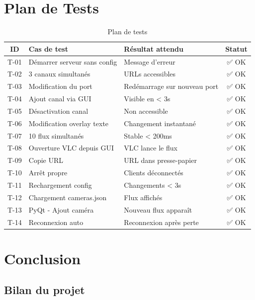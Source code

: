 \documentclass[12pt,a4paper]{report}
\begin{document}
\chapter{Plan de Tests}

\begin{table}[H]
    \centering
    \caption{Plan de tests}
    \label{tab:tests}
    \begin{tabular}{|c|l|l|c|}
        \hline
        \textbf{ID} & \textbf{Cas de test} & \textbf{Résultat attendu} & \textbf{Statut} \\
        \hline
        T-01 & Démarrer serveur sans config & Message d'erreur & ✅ OK \\
        T-02 & 3 canaux simultanés & URLs accessibles & ✅ OK \\
        T-03 & Modification du port & Redémarrage sur nouveau port & ✅ OK \\
        T-04 & Ajout canal via GUI & Visible en < 3s & ✅ OK \\
        T-05 & Désactivation canal & Non accessible & ✅ OK \\
        T-06 & Modification overlay texte & Changement instantané & ✅ OK \\
        T-07 & 10 flux simultanés & Stable < 200ms & ✅ OK \\
        T-08 & Ouverture VLC depuis GUI & VLC lance le flux & ✅ OK \\
        T-09 & Copie URL & URL dans presse-papier & ✅ OK \\
        T-10 & Arrêt propre & Clients déconnectés & ✅ OK \\
        T-11 & Rechargement config & Changements < 3s & ✅ OK \\
        T-12 & Chargement cameras.json & Flux affichés & ✅ OK \\
        T-13 & PyQt - Ajout caméra & Nouveau flux apparaît & ✅ OK \\
        T-14 & Reconnexion auto & Reconnexion après perte & ✅ OK \\
        \hline
    \end{tabular}
\end{table}

\chapter{Conclusion}

\section{Bilan du projet}
\end{document}
